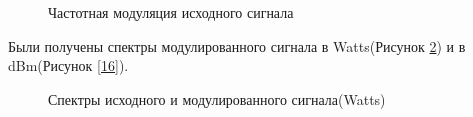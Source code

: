 \documentclass[a4paper,14pt]{extarticle}
\begin{document}
\begin{figure}[H]
\caption{Частотная модуляция исходного сигнала}
\label{14}
\end{figure}

Были получены спектры модулированного сигнала в Watts(Рисунок \ref{15}) и в dBm(Рисунок \ref{16}).

\begin{figure}[H]
\caption{Спектры исходного и модулированного сигнала(Watts)}
\label{15}
\end{figure}
\end{document}
